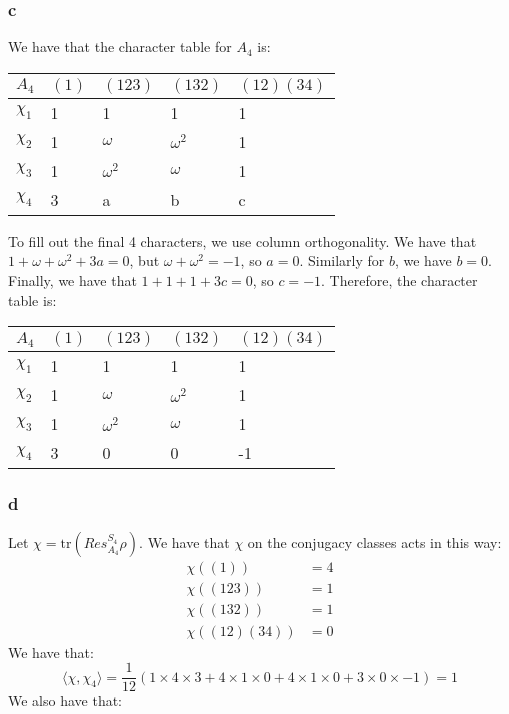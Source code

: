 \documentclass[]{article}
\newcommand{\tr}{\text{tr}}
\begin{document}
\subsubsection*{c}
We have that the character table for $A_4$ is:
\begin{table}[h!]
	\centering
	\begin{tabular}{|l|l|l|l|l|}
		\hline
		$A_4$    & $(1)$ & $(123)$    & $(132)$    & $(12)(34)$ \\ \hline
		$\chi_1$ & 1     & 1          & 1          & 1          \\ \hline
		$\chi_2$ & 1     & $\omega$   & $\omega^2$ & 1          \\ \hline
		$\chi_3$ & 1     & $\omega^2$ & $\omega$   & 1          \\ \hline
		$\chi_4$ & 3     & a          & b          & c         \\ \hline
	\end{tabular}
\end{table}
To fill out the final 4 characters, we use column orthogonality. We have that $1 + \omega + \omega^2 + 3a = 0$, but $\omega + \omega^2 = -1$, so $a = 0$. Similarly for $b$, we have $b = 0$. Finally, we have that $1 + 1 + 1 + 3c = 0$, so $c = -1$. Therefore, the character table is:

\begin{table}[h!]
	\centering
	\begin{tabular}{|l|l|l|l|l|}
		\hline
		$A_4$    & $(1)$ & $(123)$    & $(132)$    & $(12)(34)$ \\ \hline
		$\chi_1$ & 1     & 1          & 1          & 1          \\ \hline
		$\chi_2$ & 1     & $\omega$   & $\omega^2$ & 1          \\ \hline
		$\chi_3$ & 1     & $\omega^2$ & $\omega$   & 1          \\ \hline
		$\chi_4$ & 3     & 0          & 0          & -1         \\ \hline
	\end{tabular}
\end{table}
\subsubsection*{d} 
Let $\chi = \tr(Res^{S_4}_{A_4} \rho)$.
We have that $\chi$ on the conjugacy classes acts in this way:
\begin{align*}
	\chi((1)) &= 4\\
	\chi((123)) &= 1\\
	\chi((132)) &= 1\\
	\chi((12)(34)) &= 0
\end{align*}
We have that:
\begin{equation*}
	\langle \chi, \chi_4 \rangle = \frac{1}{12} \left(1 \times 4 \times 3 + 4 \times 1 \times 0 + 4 \times 1 \times 0 + 3 \times 0 \times -1\right) = 1
\end{equation*}
We also have that:
\end{document}
